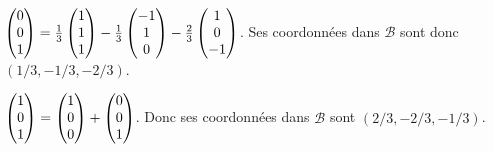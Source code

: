 {{$\begin{pmatrix}0 \cr 0 \cr 1 \cr \end{pmatrix}
=\frac{1}{3}\begin{pmatrix}1 \cr 1 \cr 1 \cr
\end{pmatrix}-\frac{1}{3}
 \begin{pmatrix}-1 \cr 1 \cr 0\cr \end{pmatrix} -\frac{2}{3} \begin{pmatrix}1 \cr 0 \cr -1 \cr \end{pmatrix}$.
 Ses coordonn\' ees
 dans  $\mathcal{B} $  sont donc  $(1/3 ,  -1/3  ,  -2/3)$.


$ \begin{pmatrix}1 \cr 0 \cr 1 \cr \end{pmatrix}= \begin{pmatrix}1
\cr 0 \cr 0 \cr \end{pmatrix}+ \begin{pmatrix}0 \cr 0 \cr 1 \cr
\end{pmatrix}$. Donc ses coordonn\' ees dans  $\mathcal{B} $  sont
$(2/3 ,  -2/3  ,  -1/3)$.
}
}
